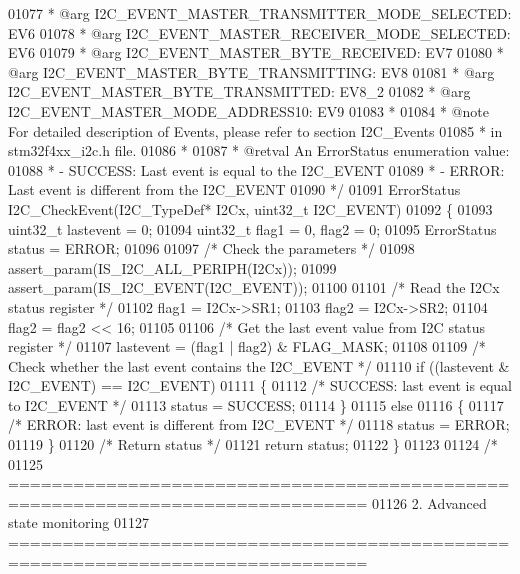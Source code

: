 \begin{DoxyCode}
01077 \textcolor{comment}{  *            @arg I2C\_EVENT\_MASTER\_TRANSMITTER\_MODE\_SELECTED: EV6     }
01078 \textcolor{comment}{  *            @arg I2C\_EVENT\_MASTER\_RECEIVER\_MODE\_SELECTED: EV6}
01079 \textcolor{comment}{  *            @arg I2C\_EVENT\_MASTER\_BYTE\_RECEIVED: EV7}
01080 \textcolor{comment}{  *            @arg I2C\_EVENT\_MASTER\_BYTE\_TRANSMITTING: EV8}
01081 \textcolor{comment}{  *            @arg I2C\_EVENT\_MASTER\_BYTE\_TRANSMITTED: EV8\_2}
01082 \textcolor{comment}{  *            @arg I2C\_EVENT\_MASTER\_MODE\_ADDRESS10: EV9}
01083 \textcolor{comment}{  *     }
01084 \textcolor{comment}{  * @note   For detailed description of Events, please refer to section I2C\_Events}
01085 \textcolor{comment}{  *         in stm32f4xx\_i2c.h file.}
01086 \textcolor{comment}{  *    }
01087 \textcolor{comment}{  * @retval An ErrorStatus enumeration value:}
01088 \textcolor{comment}{  *           - SUCCESS: Last event is equal to the I2C\_EVENT}
01089 \textcolor{comment}{  *           - ERROR: Last event is different from the I2C\_EVENT}
01090 \textcolor{comment}{  */}
01091 ErrorStatus I2C_CheckEvent(I2C\_TypeDef* I2Cx, uint32\_t I2C\_EVENT)
01092 \{
01093   uint32\_t lastevent = 0;
01094   uint32\_t flag1 = 0, flag2 = 0;
01095   ErrorStatus status = ERROR;
01096 
01097   \textcolor{comment}{/* Check the parameters */}
01098   assert_param(IS\_I2C\_ALL\_PERIPH(I2Cx));
01099   assert_param(IS\_I2C\_EVENT(I2C\_EVENT));
01100 
01101   \textcolor{comment}{/* Read the I2Cx status register */}
01102   flag1 = I2Cx->SR1;
01103   flag2 = I2Cx->SR2;
01104   flag2 = flag2 << 16;
01105 
01106   \textcolor{comment}{/* Get the last event value from I2C status register */}
01107   lastevent = (flag1 | flag2) & FLAG_MASK;
01108 
01109   \textcolor{comment}{/* Check whether the last event contains the I2C\_EVENT */}
01110   \textcolor{keywordflow}{if} ((lastevent & I2C\_EVENT) == I2C\_EVENT)
01111   \{
01112     \textcolor{comment}{/* SUCCESS: last event is equal to I2C\_EVENT */}
01113     status = SUCCESS;
01114   \}
01115   \textcolor{keywordflow}{else}
01116   \{
01117     \textcolor{comment}{/* ERROR: last event is different from I2C\_EVENT */}
01118     status = ERROR;
01119   \}
01120   \textcolor{comment}{/* Return status */}
01121   \textcolor{keywordflow}{return} status;
01122 \}
01123 
01124 \textcolor{comment}{/*}
01125 \textcolor{comment}{ ===============================================================================}
01126 \textcolor{comment}{                          2. Advanced state monitoring                   }
01127 \textcolor{comment}{ ===============================================================================  }

\end{DoxyCode}
